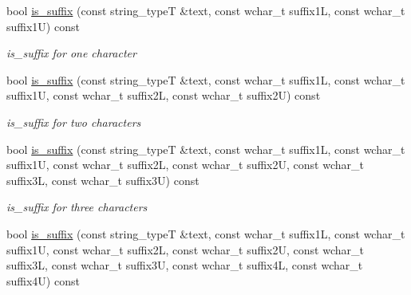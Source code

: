 \begin{DoxyCompactItemize}
\item 
\hypertarget{group___stemming_gac318ddd46a716673edf3678c47d3035c}{bool \hyperlink{group___stemming_gac318ddd46a716673edf3678c47d3035c}{is\-\_\-suffix} (const string\-\_\-type\-T \&text, const wchar\-\_\-t suffix1\-L, const wchar\-\_\-t suffix1\-U) const }\label{group___stemming_gac318ddd46a716673edf3678c47d3035c}

\begin{DoxyCompactList}\small\item\em is\-\_\-suffix for one character \end{DoxyCompactList}\item 
\hypertarget{group___stemming_gaad4dff424a3ae8a82dcfe6adac7c9d30}{bool \hyperlink{group___stemming_gaad4dff424a3ae8a82dcfe6adac7c9d30}{is\-\_\-suffix} (const string\-\_\-type\-T \&text, const wchar\-\_\-t suffix1\-L, const wchar\-\_\-t suffix1\-U, const wchar\-\_\-t suffix2\-L, const wchar\-\_\-t suffix2\-U) const }\label{group___stemming_gaad4dff424a3ae8a82dcfe6adac7c9d30}

\begin{DoxyCompactList}\small\item\em is\-\_\-suffix for two characters \end{DoxyCompactList}\item 
\hypertarget{group___stemming_gabbe6496d43b49dab0745e6d6b4e2831d}{bool \hyperlink{group___stemming_gabbe6496d43b49dab0745e6d6b4e2831d}{is\-\_\-suffix} (const string\-\_\-type\-T \&text, const wchar\-\_\-t suffix1\-L, const wchar\-\_\-t suffix1\-U, const wchar\-\_\-t suffix2\-L, const wchar\-\_\-t suffix2\-U, const wchar\-\_\-t suffix3\-L, const wchar\-\_\-t suffix3\-U) const }\label{group___stemming_gabbe6496d43b49dab0745e6d6b4e2831d}

\begin{DoxyCompactList}\small\item\em is\-\_\-suffix for three characters \end{DoxyCompactList}\item 
\hypertarget{group___stemming_ga694dd20e52adc89edadf120bf92a28ff}{bool \hyperlink{group___stemming_ga694dd20e52adc89edadf120bf92a28ff}{is\-\_\-suffix} (const string\-\_\-type\-T \&text, const wchar\-\_\-t suffix1\-L, const wchar\-\_\-t suffix1\-U, const wchar\-\_\-t suffix2\-L, const wchar\-\_\-t suffix2\-U, const wchar\-\_\-t suffix3\-L, const wchar\-\_\-t suffix3\-U, const wchar\-\_\-t suffix4\-L, const wchar\-\_\-t suffix4\-U) const }\label{group___stemming_ga694dd20e52adc89edadf120bf92a28ff}


\end{DoxyCompactItemize}
